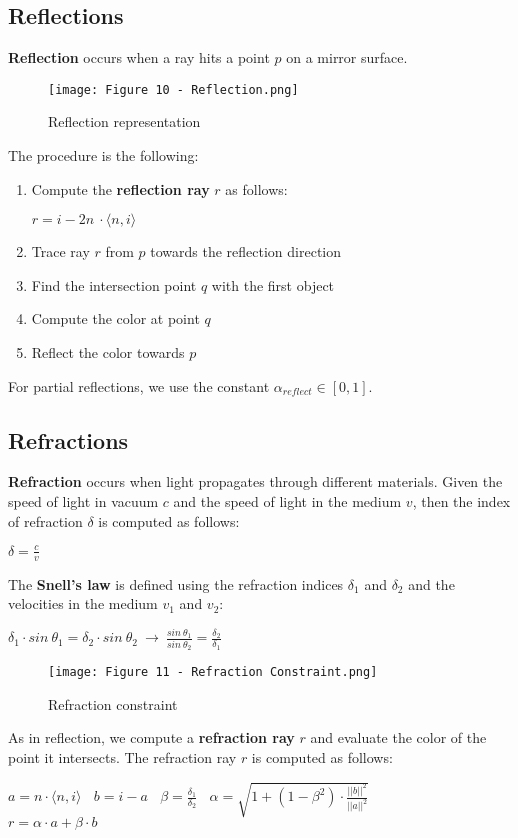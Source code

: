 \documentclass{article}
\begin{document}
\subsection{Reflections}
\textbf{Reflection} occurs when a ray hits a point $p$ on a mirror surface.
\begin{figure}[H]
    \centering
    \texttt{[image: Figure 10 - Reflection.png]}
    \caption{Reflection representation}
\end{figure}
The procedure is the following:
\begin{enumerate}
    \item Compute the \textbf{reflection ray} $r$ as follows:
        \begin{center}
            $r = i - 2n \ \cdot \langle n,i\rangle$
        \end{center}
    \item Trace ray $r$ from $p$ towards the reflection direction
    \item Find the intersection point $q$ with the first object 
    \item Compute the color at point $q$
    \item Reflect the color towards $p$
\end{enumerate}
For partial reflections, we use the constant $\alpha_{reflect} \in [0,1]$.
\subsection{Refractions}
\textbf{Refraction} occurs when light propagates through different materials. Given the speed of light in vacuum $c$ and the speed of light in the medium $v$, then the index of refraction $\delta$ is computed as follows:
\begin{center}
    $\delta = \displaystyle\frac{c}{v}$
\end{center}
The \textbf{Snell's law} is defined using the refraction indices $\delta_1$ and $\delta_2$ and the velocities in the medium $v_1$ and $v_2$:
\begin{center}
    $\delta_1 \cdot sin \ \theta_1 = \delta_2 \cdot sin \ \theta_2 \ \rightarrow \ \displaystyle\frac{sin \ \theta_1}{sin \ \theta_2} = \displaystyle\frac{\delta_2}{\delta_1}$
\end{center}
\begin{figure}[H]
    \centering
    \texttt{[image: Figure 11 - Refraction Constraint.png]}
    \caption{Refraction constraint}
\end{figure}
As in reflection, we compute a \textbf{refraction ray} $r$ and evaluate the color of the point it intersects.
The refraction ray $r$ is computed as follows:
\begin{center}
    $a = n \cdot \langle n,i\rangle \ \ \ \ b = i - a \ \ \ \ \beta = \displaystyle\frac{\delta_1}{\delta_2} \ \ \ \ \alpha = \sqrt{1 + (1 - \beta^2) \cdot \displaystyle\frac{||b||^2}{||a||^2}}$ \\
    \vspace{0.2cm}
    $r = \alpha \cdot a + \beta \cdot b$
\end{center}
\end{document}
